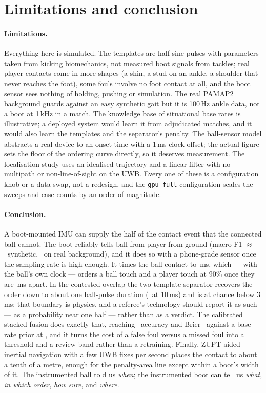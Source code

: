 \section{Limitations and conclusion}
\label{sec:conclusion}

\paragraph{Limitations.} Everything here is simulated. The templates are
half-sine pulses with parameters taken from kicking biomechanics, not measured
boot signals from tackles; real player contacts come in more shapes (a shin, a
stud on an ankle, a shoulder that never reaches the foot), some fouls involve
no foot contact at all, and the boot sensor sees nothing of holding, pushing or
simulation. The real PAMAP2 background guards against an easy synthetic gait
but it is 100\,Hz ankle data, not a boot at 1\,kHz in a match. The knowledge
base of situational base rates is illustrative; a deployed system would learn
it from adjudicated matches, and it would also learn the templates and the
separator's penalty. The ball-sensor model abstracts a real device to an onset
time with a 1\,ms clock offset; the actual figure sets the floor of the
ordering curve directly, so it deserves measurement. The localisation study
uses an idealised trajectory and a linear filter with no multipath or
non-line-of-sight on the UWB. Every one of these is a configuration knob or a
data swap, not a redesign, and the \texttt{gpu\_full} configuration scales the
sweeps and case counts by an order of magnitude.

\paragraph{Conclusion.} A boot-mounted IMU can supply the half of the contact
event that the connected ball cannot. The boot reliably tells ball from
player from ground (macro-F1 $\approx$ \DetGbFBest\ synthetic,
\DetPamGbSport\ on real background), and it does so with a phone-grade sensor
once the sampling rate is high enough. It times the ball contact to
\TimBallOneK\,ms, which --- with the ball's own clock --- orders a ball touch and
a player touch at 90\% once they are \OrdGapNinetyOneK\,ms apart. In the
contested overlap the two-template separator recovers the order down to
about one ball-pulse duration (\OvlAccTen\ at 10\,ms) and is at chance below
3\,ms; that boundary is physics, and a referee's technology should report it
as such --- as a probability near one half --- rather than as a verdict. The
calibrated stacked fusion does exactly that, reaching \DecStackAcc\ accuracy
and Brier \DecStackBrier\ against a base-rate prior at \DecPriorAcc, and it
turns the cost of a false foul versus a missed foul into a threshold and a
review band rather than a retraining. Finally, ZUPT-aided inertial navigation
with a few UWB fixes per second places the contact to about a tenth of a
metre, enough for the penalty-area line except within a boot's width of it.
The instrumented ball told us \emph{when}; the instrumented boot can tell us
\emph{what}, \emph{in which order}, \emph{how sure}, and \emph{where}.
